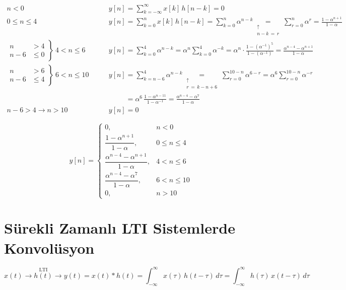 \documentclass[11pt,a4paper]{article}
\begin{document}
\begin{cozum}
\begin{align*}
  n < 0 \qquad & y[n] = \sum_{k=-\infty}^{\infty} x[k]\,h[n-k] = 0 \\
  0 \leq n \leq 4 \qquad & y[n] = \sum_{k=0}^{n} x[k]\,h[n-k] = \sum_{k=0}^{n} \alpha^{n-k} \underset{\substack{\uparrow\\ n-k\,=\,r}}{=} \sum_{r=0}^{n} \alpha^r = \frac{1 - \alpha^{n+1}}{1 - \alpha} \\
  \left.\begin{aligned} n &> 4 \\ n-6 &\leq 0 \end{aligned}\right\}\ 4 < n \leq 6 \qquad & y[n] = \sum_{k=0}^{4} \alpha^{n-k} = \alpha^n \sum_{k=0}^{4} \alpha^{-k} = \alpha^n \cdot \frac{1 - (\alpha^{-1})^5}{1 - (\alpha^{-1})} = \frac{\alpha^{n-4} - \alpha^{n+1}}{1 - \alpha} \\
  \left.\begin{aligned} n &> 6 \\ n-6 &\leq 4 \end{aligned}\right\}\ 6 < n \leq 10 \qquad & y[n] = \sum_{k=n-6}^{4} \alpha^{n-k} \underset{\substack{\uparrow\\ r\,=\,k-n+6}}{=} \sum_{r=0}^{10-n} \alpha^{6-r} = \alpha^6 \sum_{r=0}^{10-n} \alpha^{-r} \\
  & \phantom{y[n]} = \alpha^6\,\frac{1 - \alpha^{n-11}}{1 - \alpha^{-1}} = \frac{\alpha^{n-4} - \alpha^7}{1 - \alpha} \\
  n - 6 > 4 \rightarrow n > 10 \qquad & y[n] = 0
\end{align*}

\[ y[n] = \begin{cases}
  0, & n < 0 \\[1mm]
  \dfrac{1 - \alpha^{n+1}}{1 - \alpha}, & 0 \leq n \leq 4 \\[3mm]
  \dfrac{\alpha^{n-4} - \alpha^{n+1}}{1 - \alpha}, & 4 < n \leq 6 \\[3mm]
  \dfrac{\alpha^{n-4} - \alpha^{7}}{1 - \alpha}, & 6 < n \leq 10 \\[2mm]
  0, & n > 10
\end{cases} \]
\end{cozum}

\section{Sürekli Zamanlı LTI Sistemlerde Konvolüsyon}
\[ x(t) \longrightarrow \overset{\text{LTI}}{\boxed{h(t)}} \longrightarrow y(t) = x(t) \ast h(t) = \int_{-\infty}^{\infty} x(\tau)\,h(t-\tau)\,d\tau = \int_{-\infty}^{\infty} h(\tau)\,x(t-\tau)\,d\tau \]
\end{document}
